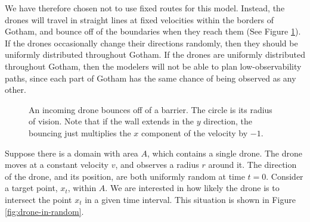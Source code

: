 \documentclass{article}
\begin{document}
We have therefore chosen not to use fixed routes for this model.
Instead, the drones will travel in straight lines at fixed velocities within 
	the borders of Gotham, and bounce off of the boundaries when they reach them  
	(See Figure \ref{fig:drone-barrier-bounce}).
If the drones occasionally change their directions randomly, then they should
	be uniformly distributed throughout Gotham.
If the drones are uniformly distributed throughout Gotham, then the modelers
	will not be able to plan low-observability paths, since each part
	of Gotham has the same chance of being observed as any other.

\begin{figure}[h]
\begin{center}
\end{center}
\caption{An incoming drone bounces off of a barrier.  The circle is its radius
	of vision.
Note that if the wall extends in the $y$ direction, the bouncing just 
	multiplies the $x$ component of the velocity by $-1$.}
\label{fig:drone-barrier-bounce}
\end{figure}


Suppose there is a domain with area $A$, which contains a single drone.
The drone moves at a constant velocity $v$, and observes a radius $r$ around it.
The direction of the drone, and its position, are both uniformly random at time $t=0$.
Consider a target point, $x_t$, within $A$.
We are interested in how likely the drone is to intersect the point $x_t$ in a
	given time interval.
This situation is shown in Figure \ref{fig:drone-in-random}.
\end{document}
